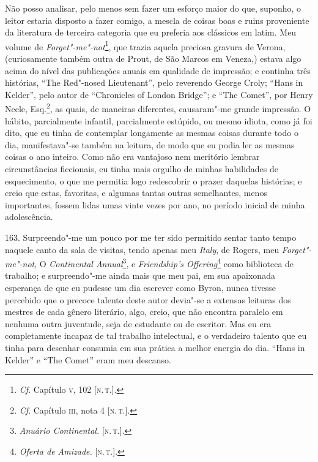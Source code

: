 Não posso analisar, pelo menos sem fazer um esforço maior do que,
suponho, o leitor estaria disposto a fazer comigo, a mescla de coisas
boas e ruins proveniente da literatura de terceira categoria que eu
preferia aos clássicos em latim. Meu volume de
\emph{Forget"-me"-not}\footnote{\emph{Cf}. Capítulo \textsc{v}, 102 {[}\textsc{n.\,t.}{]}.},
que trazia aquela preciosa gravura de Verona, (curiosamente também outra
de Prout, de São Marcos em Veneza,) estava algo acima do nível das
publicações anuais em qualidade de impressão; e continha três histórias,
``The Red"-nosed Lieutenant'', pelo reverendo George Croly; ``Hans in
Kelder'', pelo autor de ``Chronicles of London Bridge''; e ``The
Comet'', por Henry Neele, Esq.\footnote{\emph{Cf}. Capítulo \textsc{iii}, nota 4
  {[}\textsc{n.\,t.}{]}.}, as quais, de maneiras diferentes, causaram"-me grande
impressão. O hábito, parcialmente infantil, parcialmente estúpido, ou
mesmo idiota, como já foi dito, que eu tinha de contemplar longamente as
mesmas coisas durante todo o dia, manifestava"-se também na leitura, de
modo que eu podia ler as mesmas coisas o ano inteiro. Como não era
vantajoso nem meritório lembrar circunstâncias ficcionais, eu tinha mais
orgulho de minhas habilidades de esquecimento, o que me permitia logo
redescobrir o prazer daquelas histórias; e creio que estas, favoritas, e
algumas tantas outras semelhantes, menos importantes, fossem lidas umas
vinte vezes por ano, no período inicial de minha adolescência.

163. Surpreendo"-me um pouco por me ter sido permitido sentar tanto tempo
naquele canto da sala de visitas, tendo apenas meu \emph{Italy}, de
Rogers, meu \emph{Forget"-me"-not}, O \emph{Continental Annual}\footnote{\emph{Anuário
  Continental.} {[}\textsc{n.\,t.}{]}.}, e \emph{Friendship's
Offering}\footnote{\emph{Oferta de Amizade.} {[}\textsc{n.\,t.}{]}.} como
biblioteca de trabalho; e surpreendo"-me ainda mais que meu pai, em sua
apaixonada esperança de que eu pudesse um dia escrever como Byron, nunca
tivesse percebido que o precoce talento deste autor devia"-se a extensas
leituras dos mestres de cada gênero literário, algo, creio, que não
encontra paralelo em nenhuma outra juventude, seja de estudante ou de
escritor. Mas eu era completamente incapaz de tal trabalho intelectual,
e o verdadeiro talento que eu tinha para desenhar consumia em sua
prática a melhor energia do dia. ``Hans in Kelder'' e ``The Comet'' eram
meu descanso.

